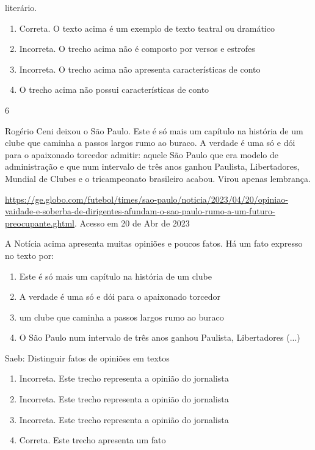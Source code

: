 {{\begin{escolha}
{\begin{itemize}
\begin{itemize}
literário.

\begin{enumerate}
\def\labelenumi{\arabic{enumi}.}
\item
  Correta. O texto acima é um exemplo de texto teatral ou dramático
\item
  Incorreta. O trecho acima não é composto por versos e estrofes
\item
  Incorreta. O trecho acima não apresenta características de conto
\item
  O trecho acima não possui características de conto
\end{enumerate}

\num{6}

Rogério Ceni deixou o São Paulo. Este é só mais um capítulo na história
de um clube que caminha a passos largos rumo ao buraco. A verdade é uma
só e dói para o apaixonado torcedor admitir: aquele São Paulo que era
modelo de administração e que num intervalo de três anos ganhou
Paulista, Libertadores, Mundial de Clubes e o tricampeonato brasileiro
acabou. Virou apenas lembrança.

\href{https://ge.globo.com/futebol/times/sao-paulo/noticia/2023/04/20/opiniao-vaidade-e-soberba-de-dirigentes-afundam-o-sao-paulo-rumo-a-um-futuro-preocupante.ghtml}{\uline{https://ge.globo.com/futebol/times/sao-paulo/noticia/2023/04/20/opiniao-vaidade-e-soberba-de-dirigentes-afundam-o-sao-paulo-rumo-a-um-futuro-preocupante.ghtml}}.
Acesso em 20 de Abr de 2023

A Notícia acima apresenta muitas opiniões e poucos fatos. Há um fato
expresso no texto por:

\begin{enumerate}
\def\labelenumi{\alph{enumi})}
\item
  Este é só mais um capítulo na história de um clube
\item
  A verdade é uma só e dói para o apaixonado torcedor
\item
  um clube que caminha a passos largos rumo ao buraco
\item
  O São Paulo num intervalo de três anos ganhou Paulista, Libertadores
  (...)
\end{enumerate}

Saeb: Distinguir fatos de opiniões em textos

\begin{enumerate}
\def\labelenumi{\arabic{enumi}.}
\item
  Incorreta. Este trecho representa a opinião do jornalista
\item
  Incorreta. Este trecho representa a opinião do jornalista
\item
  Incorreta. Este trecho representa a opinião do jornalista
\item
  Correta. Este trecho apresenta um fato
\end{enumerate}


\end{itemize}
\end{itemize}}
\end{escolha}}}
